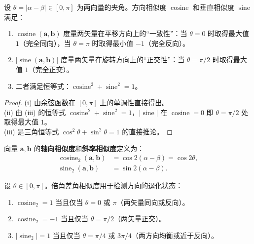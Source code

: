 \begin{proposition}[基础差角相似度的性质]\label{prop:basic_diff_similarity_properties}
设 $\theta = \lvert\alpha-\beta\rvert \in [0, \pi]$ 为两向量的夹角。方向相似度 $\operatorname{cosine}$ 和垂直相似度 $\operatorname{sine}$ 满足：
\begin{enumerate}[label=(\roman*)]
    \item $\operatorname{cosine}(\mathbf{a}, \mathbf{b})$ 度量两矢量在平移方向上的“一致性”：当 $\theta=0$ 时取得最大值 $1$（完全同向），当 $\theta=\pi$ 时取得最小值 $-1$（完全反向）。
    \item $\lvert\operatorname{sine}(\mathbf{a}, \mathbf{b})\rvert$ 度量两矢量在旋转方向上的“正交性”：当 $\theta=\pi/2$ 时取得最大值 $1$（完全正交）。
    \item 二者满足恒等式：$\operatorname{cosine}^2 + \operatorname{sine}^2 = 1$。
\end{enumerate}
\end{proposition}

\begin{proof}
(i) 由余弦函数在 $[0,\pi]$ 上的单调性直接得出。\\
(ii) 由 (iii) 的恒等式 $\operatorname{cosine}^2+\operatorname{sine}^2=1$，$\lvert\operatorname{sine}\rvert$ 在 $\operatorname{cosine}=0$ 即 $\theta=\pi/2$ 处取得最大值 $1$。\\
(iii) 是三角恒等式 $\cos^2\theta + \sin^2\theta = 1$ 的直接推论。
\end{proof}

\begin{definition}[倍角差角相似度]\label{def:double_diff_similarity}
向量 $\mathbf{a}, \mathbf{b}$ 的\textbf{轴向相似度}和\textbf{斜率相似度}定义为：
\begin{align*}
\operatorname{cosine}_2(\mathbf{a}, \mathbf{b}) &= \cos 2(\alpha - \beta) = \cos 2\theta, \\
\operatorname{sine}_2(\mathbf{a}, \mathbf{b}) &= \sin 2(\alpha - \beta).
\end{align*}
\end{definition}

\begin{proposition}[倍角差角相似度的退化检测]\label{prop:double_diff_degeneracy}
设 $\theta \in [0,\pi]$。倍角差角相似度用于检测方向的退化状态：
\begin{enumerate}[label=(\roman*)]
    \item $\operatorname{cosine}_2 = 1$ 当且仅当 $\theta = 0$ 或 $\pi$（两矢量同向或反向）。
    \item $\operatorname{cosine}_2 = -1$ 当且仅当 $\theta = \pi/2$（两矢量正交）。
    \item $\lvert\operatorname{sine}_2\rvert = 1$ 当且仅当 $\theta = \pi/4$ 或 $3\pi/4$（两方向均衡或近于反向）。
\end{enumerate}
\end{proposition}

